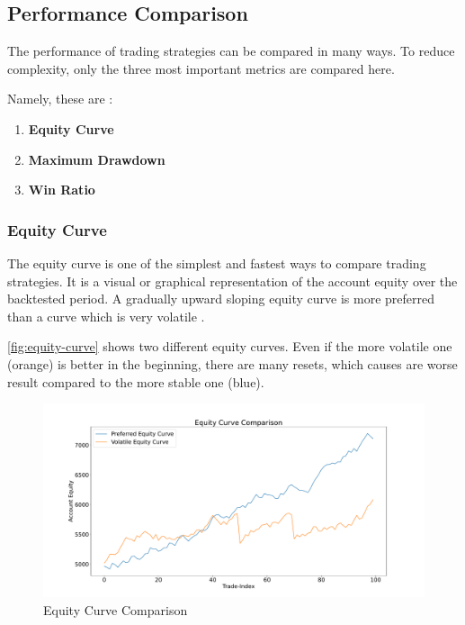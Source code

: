 \subsection{Performance Comparison}

The performance of trading strategies can be compared in many ways.
To reduce complexity, only the three most important metrics are compared here.

Namely, these are \cite{performace}:

\begin{enumerate}
    \item \textbf{Equity Curve}
    \item \textbf{Maximum Drawdown}
    \item \textbf{Win Ratio}
\end{enumerate}

\subsubsection{Equity Curve}
\label{chap:equity-curve}

The equity curve is one of the simplest and fastest ways to compare trading strategies.
It is a visual or graphical representation of the account equity over the backtested period.
A gradually upward sloping equity curve is more preferred than a curve which is very volatile \cite{performace}.

\autoref{fig:equity-curve} shows two different equity curves.
Even if the more volatile one (orange) is better in the beginning, there are many resets, which causes are worse result compared to the more stable one (blue).

\begin{figure}[H]
    \centering
    \includegraphics[width=\textwidth]{images/trading-strategies/equity-curve}
    \caption{Equity Curve Comparison}
    \label{fig:equity-curve}
\end{figure}

